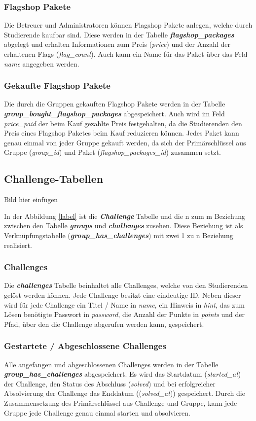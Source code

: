 \subsubsection{Flagshop Pakete}
Die Betreuer und Administratoren können Flagshop Pakete anlegen, welche durch Studierende kaufbar sind. Diese werden in der Tabelle \textbf{\textit{flagshop\_packages}} abgelegt und erhalten Informationen zum Preis (\textit{price}) und der Anzahl der erhaltenen Flags (\textit{flag\_count}). Auch kann ein Name für das Paket über das Feld \textit{name} angegeben werden.

\subsubsection{Gekaufte Flagshop Pakete}
Die durch die Gruppen gekauften Flagshop Pakete werden in der Tabelle \textbf{\textit{group\_bought\_flagshop\_packages}} abgespeichert. Auch wird im Feld \textit{price\_paid} der beim Kauf gezahlte Preis festgehalten, da die Studierenden den Preis eines Flagshop Paketes beim Kauf reduzieren können. Jedes Paket kann genau einmal von jeder Gruppe gekauft werden, da sich der Primärschlüssel aus Gruppe (\textit{group\_id}) und Paket (\textit{flagshop\_packages\_id}) zusammen setzt.

\subsection{Challenge-Tabellen}
Bild hier einfügen

In der Abbildung \ref{label} ist die \textbf{\textit{Challenge}} Tabelle und die n zum m Beziehung zwischen den Tabelle \textbf{\textit{groups}} und \textbf{\textit{challenges}} zusehen. Diese Beziehung ist als Verknüpfungstabelle (\textbf{\textit{group\_has\_challenges}}) mit zwei 1 zu n Beziehung realisiert.

\subsubsection{Challenges}
Die \textbf{\textit{challenges}} Tabelle beinhaltet alle Challenges, welche von den Studierenden gelöst werden können. Jede Challenge besitzt eine eindeutige ID. Neben dieser wird für jede Challenge ein Titel / Name in \textit{name}, ein Hinweis in \textit{hint}, das zum Lösen benötigte Passwort in \textit{password}, die Anzahl der Punkte in \textit{points} und der Pfad, über den die Challenge abgerufen werden kann, gespeichert.

\subsubsection{Gestartete / Abgeschlossene Challenges}
Alle angefangen und abgeschlossenen Challenges werden in der Tabelle \textbf{\textit{group\_has\_challenges}} abgespeichert. Es wird das Startdatum (\textit{started\_at}) der Challenge, den Status des Abschluss (\textit{solved}) und bei erfolgreicher Absolvierung der Challenge das Enddatum ((\textit{solved\_at})) gespeichert. Durch die Zusammensetzung des Primärschlüssel aus Challenge und Gruppe, kann jede Gruppe jede Challenge genau einmal starten und absolvieren.

